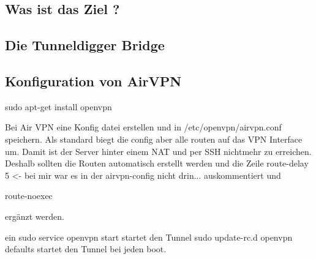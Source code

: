 \subsection{Was ist das Ziel ?}




\subsection{Die Tunneldigger Bridge}






\subsection{Konfiguration von AirVPN}

sudo apt-get install openvpn

Bei Air VPN eine Konfig datei erstellen und  in /etc/openvpn/airvpn.conf speichern.
Als standard biegt die config aber alle routen auf das VPN Interface um. Damit ist der Server hinter einem NAT und per SSH nichtmehr zu erreichen. 
Deshalb sollten die Routen automatisch erstellt werden und die Zeile
route-delay 5 <- bei mir war es in der airvpn-config nicht drin...
auskommentiert und

route-noexec

ergänzt werden.

ein 
sudo service openvpn start 
startet den Tunnel
sudo update-rc.d openvpn defaults
startet den Tunnel bei jeden boot.


















